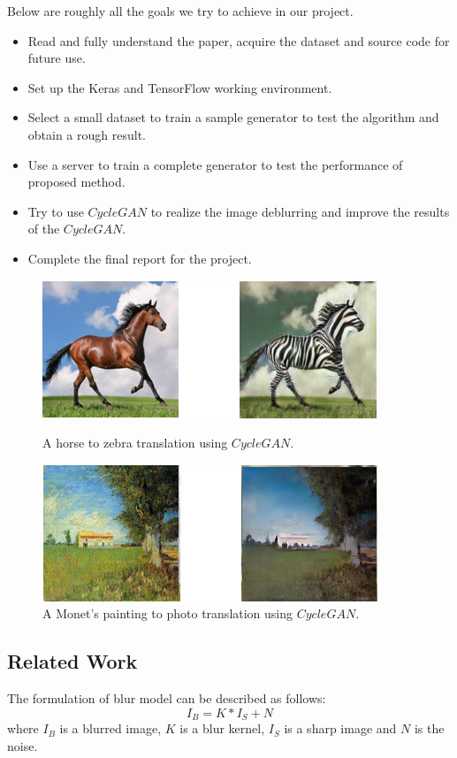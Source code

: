 \documentclass[journal]{IEEEtran}
\begin{document}
Below are roughly all the goals we try to achieve in our project.
\begin{itemize}
	\item Read and fully understand the paper, acquire the dataset and source code for future use.
	\item  Set up the Keras and TensorFlow working environment.
	\item  Select a small dataset to train a sample generator to test the algorithm and obtain a rough result.
	\item Use a server to train a complete generator to test the performance of proposed method.
	\item Try to use $CycleGAN$ to realize the image deblurring and improve the results of the $CycleGAN$.
	\item Complete the final report for the project.
\end{itemize}
\begin{figure}[htbp]
	\centering
	\footnotesize
	\includegraphics[width=0.8\linewidth]{fig/exam1.jpg}
	\caption{A horse to zebra translation using $CycleGAN$.}
		\label{sample1}
	\includegraphics[width=0.8\linewidth]{fig/exam3.jpg}
	\caption{A Monet's painting to photo translation using $CycleGAN$. }
	\label{sample2}
\end{figure}
\subsection{Related Work}
The formulation of blur model can be described as follows:
\begin{equation}
I_B=K*I_S+N
\end{equation}
where $I_B$ is a blurred image, $K$ is a blur kernel, $I_S$ is a sharp image and $N$ is the noise.
 
\end{document}
